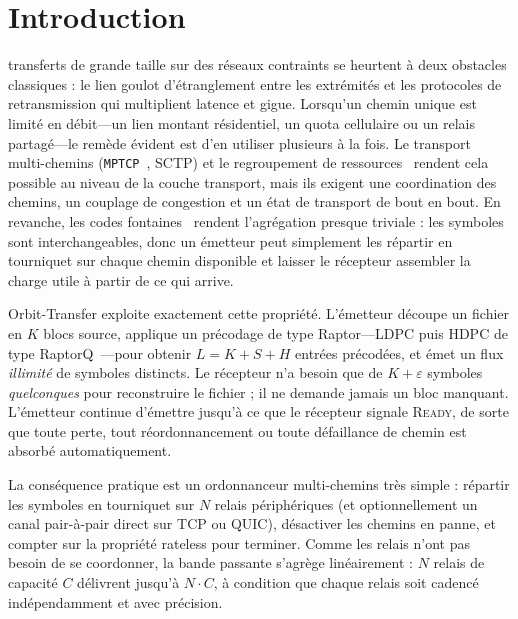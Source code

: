 \documentclass[conference]{IEEEtran}
\begin{document}
\section{Introduction}
 transferts de grande taille sur des réseaux contraints se
heurtent à deux obstacles classiques : le lien goulot d'étranglement entre les
extrémités et les protocoles de retransmission qui multiplient latence et
gigue. Lorsqu'un chemin unique est limité en débit---un lien montant
résidentiel, un quota cellulaire ou un relais partagé---le remède évident est
d'en utiliser plusieurs à la fois. Le transport multi-chemins
(\texttt{MPTCP}~\cite{rfc6824}, SCTP) et le regroupement de
ressources~\cite{wischik2008survey} rendent cela possible au niveau de la
couche transport, mais ils exigent une coordination des chemins, un couplage de
congestion et un état de transport de bout en bout. En revanche, les codes
fontaines~\cite{byers1998digital,luby2002lt,mackay2005fountain} rendent
l'agrégation presque triviale : les symboles sont interchangeables, donc un
émetteur peut simplement les répartir en tourniquet sur chaque chemin
disponible et laisser le récepteur assembler la charge utile à partir de ce qui
arrive.

Orbit-Transfer exploite exactement cette propriété. L'émetteur découpe un
fichier en $K$ blocs source, applique un précodage de type Raptor---LDPC
puis HDPC de type RaptorQ~\cite{shokrollahi2006raptor,rfc6330}---pour obtenir
$L=K+S+H$ entrées précodées, et
émet un flux \emph{illimité} de symboles distincts. Le récepteur n'a besoin que
de $K+\varepsilon$ symboles \emph{quelconques} pour reconstruire le fichier ;
il ne demande jamais un bloc manquant. L'émetteur continue d'émettre jusqu'à ce
que le récepteur signale \textsc{Ready}, de sorte que toute perte, tout
réordonnancement ou toute défaillance de chemin est absorbé automatiquement.

La conséquence pratique est un ordonnanceur multi-chemins très simple :
répartir les symboles en tourniquet sur $N$ relais périphériques (et
optionnellement un canal pair-à-pair direct sur TCP ou QUIC), désactiver les
chemins en
panne, et compter sur la propriété rateless pour terminer. Comme les relais
n'ont pas besoin de se coordonner, la bande passante s'agrège linéairement :
$N$ relais de capacité $C$ délivrent jusqu'à $N\cdot C$, à condition que chaque
relais soit cadencé indépendamment et avec précision.
\end{document}
